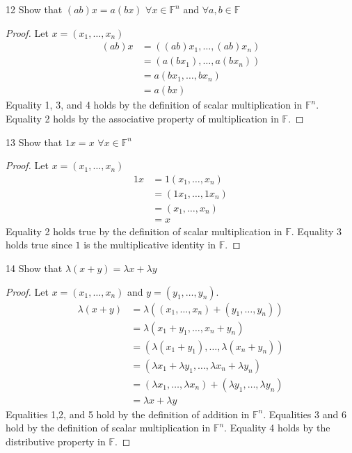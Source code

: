 \documentclass[12pt]{article}
\newenvironment{problem}[1]{\begin{prob*}{#1}{}}{\end{prob*}}
\begin{document}
\begin{problem}{12}
Show that $(ab)x=a(bx)$ $\forall x\in \mathbb{F}^n$ and $\forall a,b\in \mathbb{F}$
\end{problem}
\begin{proof}
    Let $x=(x_1,\ldots,x_n)$
    \begin{align*}
        (ab)x&=((ab)x_1,\ldots,(ab)x_n)\\
        &=(a(bx_1),\ldots,a(bx_n))\\
        &=a(bx_1,\ldots,bx_n)\\
        &=a(bx)
    \end{align*}
    Equality 1, 3, and 4 holds by the definition of scalar multiplication in $\mathbb{F}^n$. Equality 2 holds by the associative property of multiplication in $\mathbb{F}$.
\end{proof}

\begin{problem}{13}
Show that $1x=x$ $\forall x\in \mathbb{F}^n$
\end{problem}
\begin{proof}
    Let $x=(x_1,\ldots,x_n)$
    \begin{align*}
        1x&=1(x_1,\ldots,x_n)\\
        &=(1x_1,\ldots,1x_n)\\
        &=(x_1,\ldots,x_n)\\
        &=x
    \end{align*}
    Equality 2 holds true by the definition of scalar multiplication in $\mathbb{F}$. Equality 3 holds true since $1$ is the multiplicative identity in $\mathbb{F}$.
\end{proof}

\begin{problem}{14}
Show that $\lambda(x+y)=\lambda x+\lambda y$
\end{problem}
\begin{proof}
    Let $x=(x_1,\ldots ,x_n)$ and $y=(y_1,\ldots,y_n)$.
    \begin{align*}
        \lambda (x+y)&=\lambda((x_1,\ldots, x_n)+(y_1,\ldots,y_n))\\
        &=\lambda(x_1+y_1,\ldots,x_n+y_n)\\
        &=(\lambda (x_1+y_1),\ldots, \lambda(x_n+y_n))\\
        &=(\lambda x_1 + \lambda y_1,\ldots, \lambda x_n +\lambda y_n)\\
        &=(\lambda x_1,\ldots, \lambda x_n)+(\lambda y_1,\ldots, \lambda y_n)\\
        &=\lambda x + \lambda y
    \end{align*}
    Equalities 1,2, and 5 hold by the definition of addition in $\mathbb{F}^n$. Equalities 3 and 6 hold by the definition of scalar multiplication in $\mathbb{F}^n$. Equality 4 holds by the distributive property in $\mathbb{F}$. 
\end{proof}
\end{document}
